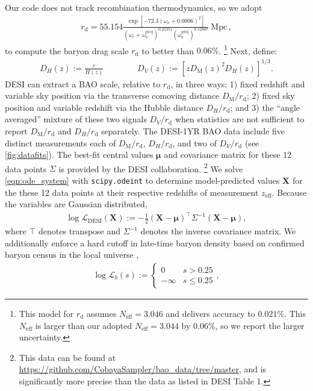 \documentclass[a4paper,11pt]{article}
\begin{document}
Our code does not track recombination thermodynamics, so we adopt \cite[][Eqn.~(16)]{aubourg2015}
\begin{align}
  r_\mathrm{d} = 55.154 \frac{\exp\left[-72.3\left(\omega_\nu + 0.0006\right)^2\right]}{\left(\omega_c + \omega_b^\mathrm{proj}\right)^{0.25351}\left(\omega_b^{\mathrm{proj}}\right)^{0.12807}}~\mathrm{Mpc}\,,
\end{align}
to compute the baryon drag scale $r_\mathrm{d}$ to better than $0.06\%$.%
\footnote{This model for $r_\mathrm{d}$ assumes $N_\mathrm{eff} = 3.046$ and delivers accuracy to $0.021\%$.
This $N_\mathrm{eff}$ is larger than our adopted $N_\mathrm{eff} = 3.044$ by $0.06\%$, so we report the larger uncertainty.}
Next, define:
\begin{align}
  D_H(z) := \frac{c}{H(z)} \qquad\qquad D_V(z) := \left[z D_\mathrm{M}(z)^2D_H(z)\right]^{1/3}.
\end{align}
DESI can extract a BAO scale, relative to $r_\mathrm{d}$, in three ways: 1) fixed redshift and variable sky position via the transverse comoving distance $D_\mathrm{M}/r_\mathrm{d}$; 2) fixed sky position and variable redshift via the Hubble distance $D_H/r_\mathrm{d}$; and 3) the ``angle averaged'' mixture of these two signals $D_V/r_\mathrm{d}$ when statistics are not sufficient to report $D_\mathrm{M}/r_\mathrm{d}$ and $D_H/r_\mathrm{d}$ separately.
The DESI-1YR BAO data include five distinct measurements each of $D_\mathrm{M}/r_\mathrm{d}$, $D_H/r_\mathrm{d}$, and two of $D_V/r_\mathrm{d}$ (see \cref{fig:datafits}).
The best-fit central values $\mathbf{\mu}$ and covariance matrix for these 12 data points $\Sigma$ is provided by the DESI collaboration.%
\footnote{This data can be found at \url{https://github.com/CobayaSampler/bao_data/tree/master}, and is significantly more precise than the data as listed in DESI Table 1.}
We solve \cref{eqn:ode_system} with \texttt{scipy.odeint} to determine model-predicted values $\mathbf{X}$ for the these 12 data points at their respective redshifts of measurement $z_\mathrm{eff}$.
Because the variables are Gaussian distributed,
\begin{align}
  \log \mathcal{L}_\mathrm{DESI}(\mathbf{X}) := -\frac{1}{2} (\mathbf{X} - \mathbf{\mu})^\top \Sigma^{-1} (\mathbf{X} - \mathbf{\mu}),
\end{align}
where $\top$ denotes transpose and $\Sigma^{-1}$ denotes the inverse covariance matrix.
We additionally enforce a hard cutoff in late-time baryon density based on confirmed baryon census in the local universe \cite{Driver2021},
\begin{align}
  \log \mathcal{L}_b\left(s\right) :=
  \begin{cases}
    0 & s > 0.25 \\
    -\infty & s \leqslant 0.25
    \end{cases},
\end{align}
\end{document}
